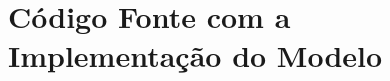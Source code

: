 \documentclass{article}
\begin{document}





\newpage
\appendix
\section{Código Fonte com a Implementação do Modelo}


\end{document}
